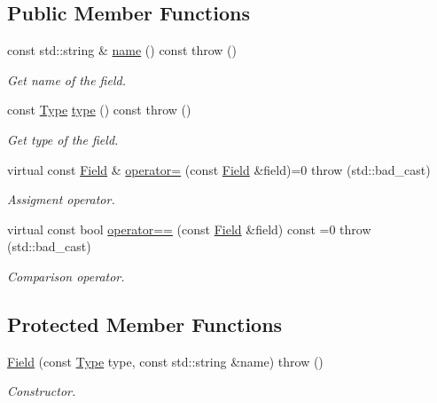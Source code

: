 \subsection*{Public Member Functions}
\begin{DoxyCompactItemize}
\item 
const std::string \& \hyperlink{classCore_1_1Field_a3e49efbf0b184847c9fec35967268455}{name} () const   throw ()
\begin{DoxyCompactList}\small\item\em Get name of the field. \item\end{DoxyCompactList}\item 
const \hyperlink{classCore_1_1Field_abd8b92d37ab4c79a2a15ec647c38cc9f}{Type} \hyperlink{classCore_1_1Field_a92b8fa2a9a299655f8d4bd582023a7fa}{type} () const   throw ()
\begin{DoxyCompactList}\small\item\em Get type of the field. \item\end{DoxyCompactList}\item 
virtual const \hyperlink{classCore_1_1Field}{Field} \& \hyperlink{classCore_1_1Field_a3300f5867380b0e55bcd6c1918815e1f}{operator=} (const \hyperlink{classCore_1_1Field}{Field} \&field)=0  throw (std::bad\_\-cast)
\begin{DoxyCompactList}\small\item\em Assigment operator. \item\end{DoxyCompactList}\item 
virtual const bool \hyperlink{classCore_1_1Field_ae2db5ff861ee23a5d5cc43913544a4ab}{operator==} (const \hyperlink{classCore_1_1Field}{Field} \&field) const =0  throw (std::bad\_\-cast)
\begin{DoxyCompactList}\small\item\em Comparison operator. \item\end{DoxyCompactList}\end{DoxyCompactItemize}
\subsection*{Protected Member Functions}
\begin{DoxyCompactItemize}
\item 
\hyperlink{classCore_1_1Field_aeadb5d1caecc973dcaa12974443edba4}{Field} (const \hyperlink{classCore_1_1Field_abd8b92d37ab4c79a2a15ec647c38cc9f}{Type} type, const std::string \&name)  throw ()
\begin{DoxyCompactList}\small\item\em Constructor. \item\end{DoxyCompactList}\end{DoxyCompactItemize}



